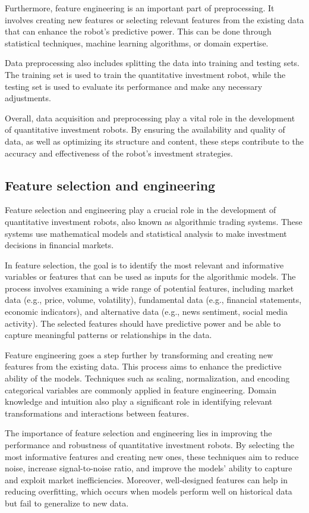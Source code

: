 \documentclass[UTF8]{ctexart}
\begin{document}
Furthermore, feature engineering is an important part of preprocessing. It involves creating new features or selecting relevant features from the existing data that can enhance the robot's predictive power. This can be done through statistical techniques, machine learning algorithms, or domain expertise.

Data preprocessing also includes splitting the data into training and testing sets. The training set is used to train the quantitative investment robot, while the testing set is used to evaluate its performance and make any necessary adjustments.

Overall, data acquisition and preprocessing play a vital role in the development of quantitative investment robots. By ensuring the availability and quality of data, as well as optimizing its structure and content, these steps contribute to the accuracy and effectiveness of the robot's investment strategies.
\subsection{Feature selection and engineering}
Feature selection and engineering play a crucial role in the development of quantitative investment robots, also known as algorithmic trading systems. These systems use mathematical models and statistical analysis to make investment decisions in financial markets.

In feature selection, the goal is to identify the most relevant and informative variables or features that can be used as inputs for the algorithmic models. The process involves examining a wide range of potential features, including market data (e.g., price, volume, volatility), fundamental data (e.g., financial statements, economic indicators), and alternative data (e.g., news sentiment, social media activity). The selected features should have predictive power and be able to capture meaningful patterns or relationships in the data.

Feature engineering goes a step further by transforming and creating new features from the existing data. This process aims to enhance the predictive ability of the models. Techniques such as scaling, normalization, and encoding categorical variables are commonly applied in feature engineering. Domain knowledge and intuition also play a significant role in identifying relevant transformations and interactions between features.

The importance of feature selection and engineering lies in improving the performance and robustness of quantitative investment robots. By selecting the most informative features and creating new ones, these techniques aim to reduce noise, increase signal-to-noise ratio, and improve the models' ability to capture and exploit market inefficiencies. Moreover, well-designed features can help in reducing overfitting, which occurs when models perform well on historical data but fail to generalize to new data.
\end{document}
